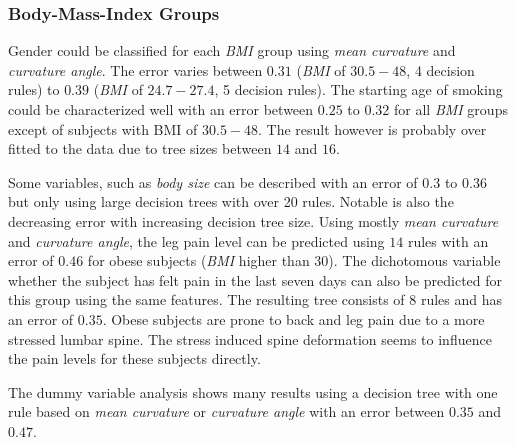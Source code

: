 \documentclass[a4paper,twoside]{style/article}
\newcommand{\com}[1]{\textcolor{orange}{\uline{#1}}}
\begin{document}
\subsubsection{Body-Mass-Index Groups}
Gender could be classified for each \emph{BMI} group using \emph{mean curvature} and \emph{curvature angle}.
The error varies between $0.31$ (\emph{BMI} of \emph{$30.5-48$}, 4 decision rules) to $0.39$ (\emph{BMI} of \emph{$24.7-27.4$}, 5 decision rules).
The starting age of smoking could be characterized well with an error between $0.25$ to $0.32$ for all \emph{BMI} groups except of subjects with BMI of \emph{$30.5-48$}.
The result however is probably over fitted to the data due to tree sizes between $14$ and $16$.

Some variables, such as \emph{body size} can be described with an error of $0.3$ to $0.36$ but only using large decision trees with over 20 rules.
Notable is also the decreasing error with increasing decision tree size.
Using mostly \emph{mean curvature} and \emph{curvature angle}, the leg pain level can be predicted using $14$ rules with an error of $0.46$ for obese subjects (\emph{BMI} higher than $30$).
The dichotomous variable whether the subject has felt pain in the last seven days can also be predicted for this group using the same features.
The resulting tree consists of $8$ rules and has an error of $0.35$.
Obese subjects are prone to back and leg pain due to a more stressed lumbar spine.
The stress induced spine deformation seems to influence the pain levels for these subjects directly.

The dummy variable analysis shows many results using a decision tree with one rule based on \emph{mean curvature} or \emph{curvature angle} with an error between $0.35$ and $0.47$.
\end{document}
